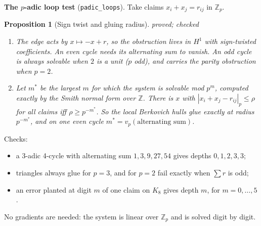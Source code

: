 \documentclass[11pt]{article}
\newtheorem{proposition}[theorem]{Proposition}
\theoremstyle{definition}
\theoremstyle{remark}
\newcommand{\Z}{\mathbb{Z}}
\newcommand{\st}[1]{\textsf{\small\color{gray}#1}}
\begin{document}
\textbf{The $p$-adic loop test} (\texttt{padic\_loops}). Take claims $x_i+x_j=r_{ij}$ in $\Z_p$.
\begin{proposition}[Sign twist and gluing radius]\label{prop:padic}\st{proved; checked}
\leavevmode
\begin{enumerate}
  \item The edge acts by $x\mapsto -x+r$, so the obstruction lives in $H^1$ with sign-twisted coefficients. An even cycle needs its alternating sum to vanish. An odd cycle is always solvable when $2$ is a unit ($p$ odd), and carries the parity obstruction when $p=2$.
  \item Let $m^*$ be the largest $m$ for which the system is solvable mod $p^m$, computed exactly by the Smith normal form over $\Z$. There is $x$ with $|x_i+x_j-r_{ij}|_p\le\rho$ for all claims iff $\rho\ge p^{-m^*}$. So the local Berkovich hulls glue exactly at radius $p^{-m^*}$, and on one even cycle $m^*=v_p(\text{alternating sum})$.
\end{enumerate}
\end{proposition}
Checks:
\begin{itemize}
  \item a 3-adic 4-cycle with alternating sum $1,3,9,27,54$ gives depths $0,1,2,3,3$;
  \item triangles always glue for $p=3$, and for $p=2$ fail exactly when $\sum r$ is odd;
  \item an error planted at digit $m$ of one claim on $K_8$ gives depth $m$, for $m=0,\dots,5$.
\end{itemize}
No gradients are needed: the system is linear over $\Z_p$ and is solved digit by digit.
\end{document}
